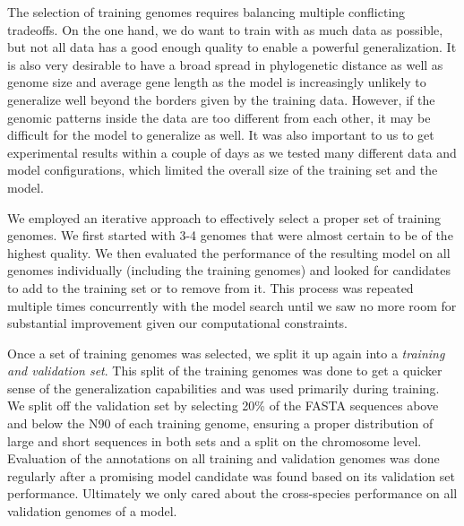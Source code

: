\documentclass{bioinfo}
\begin{document}
\begin{methods}
The selection of training genomes requires balancing multiple conflicting tradeoffs. On the one hand, we do want to train with as much data as possible, but not all data has a good enough quality to enable a powerful generalization. It is also very desirable to have a broad spread in phylogenetic distance as well as genome size and average gene length as the model is increasingly unlikely to generalize well beyond the borders given by the training data. However, if the genomic patterns inside the data are too different from each other, it may be difficult for the model to generalize as well. It was also important to us to get experimental results within a couple of days as we tested many different data and model configurations, which limited the overall size of the training set and the model. 
	
We employed an iterative approach to effectively select a proper set of training genomes. We first started with 3-4 genomes that were almost certain to be of the highest quality. We then evaluated the performance of the resulting model on all genomes individually (including the training genomes) and looked for candidates to add to the training set or to remove from it. This process was repeated multiple times concurrently with the model search until we saw no more room for substantial improvement given our computational constraints.

Once a set of training genomes was selected, we split it up again into a {\it training and validation set}. This split of the training genomes was done to get a quicker sense of the generalization capabilities and was used primarily during training. We split off the validation set by selecting 20\% of the FASTA sequences above and below the N90 of each training genome, ensuring a proper distribution of large and short sequences in both sets and a split on the chromosome level. Evaluation of the annotations on all training and validation genomes was done regularly after a promising model candidate was found based on its validation set performance. Ultimately we only cared about the cross-species performance on all validation genomes of a model.


\end{methods}
\end{document}
